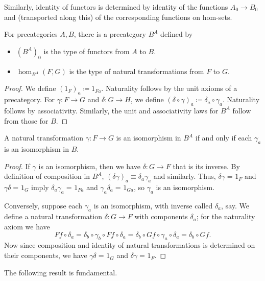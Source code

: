 \documentclass{amsart}
\newcommand{\jdeq}{\equiv}      %
\newcommand{\defeq}{\coloneqq}  %
\newcommand{\id}[3][]{\ensuremath{#2 =_{#1} #3}\xspace}
\theoremstyle{definition}
\theoremstyle{remark}
\numberwithin{equation}{section}
\begin{document}
Similarly, identity of functors is determined by identity of the functions $A_0\to B_0$ and (transported along this) of the corresponding functions on hom-sets.

\begin{defn}\label{ct:functor-precat}
  For precategories $A,B$, there is a precategory $B^A$ defined by
  \begin{itemize}
  \item $(B^A)_0$ is the type of functors from $A$ to $B$.
  \item $\hom_{B^A}(F,G)$ is the type of natural transformations from $F$ to $G$.
  \end{itemize}
\end{defn}
\begin{proof}
  We define $(1_F)_a\defeq 1_{Fa}$.
  Naturality follows by the unit axioms of a precategory.
  For $\gamma:F\to G$ and $\delta:G\to H$, we define $(\delta\circ\gamma)_a\defeq \delta_a\circ \gamma_a$.
  Naturality follows by associativity.
  Similarly, the unit and associativity laws for $B^A$ follow from those for $B$.
\end{proof}

\begin{lem}\label{ct:natiso}
  A natural transformation $\gamma:F\to G$ is an isomorphism in $B^A$ if and only if each $\gamma_a$ is an isomorphism in $B$.
\end{lem}
\begin{proof}
  If $\gamma$ is an isomorphism, then we have $\delta:G\to F$ that is its inverse.
  By definition of composition in $B^A$, $(\delta\gamma)_a\jdeq \delta_a\gamma_a$ and similarly.
  Thus, $\id{\delta\gamma}{1_F}$ and $\id{\gamma\delta}{1_G}$ imply $\id{\delta_a\gamma_a}{1_{Fa}}$ and $\id{\gamma_a\delta_a}{1_{Ga}}$, so $\gamma_a$ is an isomorphism.

  Conversely, suppose each $\gamma_a$ is an isomorphism, with inverse called $\delta_a$, say.
We define a natural transformation $\delta:G\to F$ with components $\delta_a$; for the naturality axiom we have
  \[ Ff\circ \delta_a = \delta_b\circ \gamma_b\circ Ff \circ \delta_a = \delta_b\circ Gf\circ \gamma_a\circ \delta_a = \delta_b\circ Gf. \]
  Now since composition and identity of natural transformations is determined on their components, we have $\id{\gamma\delta}{1_G}$ and $\id{\delta\gamma}{1_F}$.
\end{proof}

The following result is fundamental.
\end{document}
